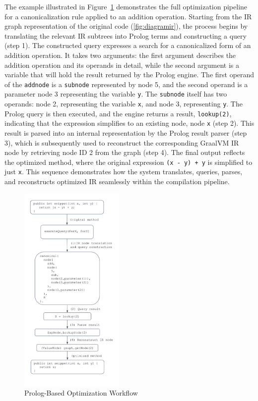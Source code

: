 The example illustrated in Figure~\ref{fig:diagram} demonstrates the full optimization pipeline for a canonicalization rule applied to an addition operation. 
Starting from the IR graph representation of the original code (\autoref{fig:diagramir}), the process begins by translating the relevant IR subtrees into Prolog terms and constructing a query (step 1). The constructed query expresses a search for a canonicalized form of an addition operation. It takes two arguments: the first argument describes the addition operation and its operands in detail, while the second argument is a variable that will hold the result returned by the Prolog engine. The first operand of the \texttt{addnode} is a \texttt{subnode} represented by node 5, and the second operand is a parameter node 3 representing the variable \texttt{y}. The \texttt{subnode} itself has two operands: node 2, representing the variable \texttt{x}, and node 3, representing \texttt{y}. The Prolog query is then executed, and the engine returns a result, \texttt{lookup(2)}, indicating that the expression simplifies to an existing node, node \texttt{x} (step 2). This result is parsed into an internal representation by the Prolog result parser (step 3), which is subsequently used to reconstruct the corresponding GraalVM IR node by retrieving node ID 2 from the graph (step 4). The final output reflects the optimized method, where the original expression \texttt{(x - y) + y} is simplified to just \texttt{x}. This sequence demonstrates how the system translates, queries, parses, and reconstructs optimized IR seamlessly within the compilation pipeline.

\begin{figure}
    \centering
    \includegraphics[width=0.45\textwidth]{./Packages/diagram.png}
    \caption{Prolog-Based Optimization Workflow}
    \label{fig:diagram}
\end{figure}


